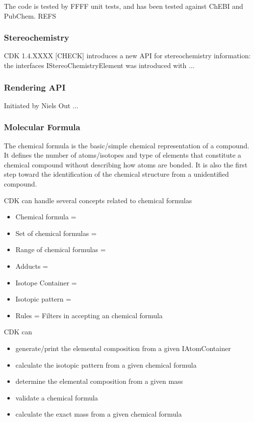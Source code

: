 \documentclass[10pt]{bmc_article}
\newenvironment{bmcformat}{\begin{raggedright}\baselineskip20pt\sloppy\setboolean{publ}{false}}{\end{raggedright}\baselineskip20pt\sloppy}
\begin{document}
\begin{bmcformat}
  The code is tested by FFFF unit tests, and has been tested against ChEBI and PubChem. REFS

  \subsubsection*{Stereochemistry}
  
  CDK 1.4.XXXX [CHECK] introduces a new API for stereochemistry information: the interfaces
  IStereoChemistryElement was introduced with ...

  \subsubsection*{Rendering API}
  
  Initiated by Niels Out ...
  
  \subsubsection*{Molecular Formula}

The chemical formula is the basic/simple chemical representation of a compound. It defines the number of atoms/isotopes and type of elements that constitute a chemical compound without describing how atoms are bonded.
It is also the first step toward the identification of the chemical structure from a unidentified compound.

CDK can handle several concepts related to chemical formulas
\begin{itemize}
\item Chemical formula =
\item Set of chemical formulas =
\item Range of chemical formulas =
\item Adducts =
\item Isotope Container =
\item Isotopic pattern = 
\item Rules = Filters in accepting an chemical formula
\end{itemize}

CDK can
\begin{itemize}
\item generate/print the elemental composition from a given IAtomContainer
\item calculate the isotopic pattern from a given chemical formula
\item determine the elemental composition from a given mass
\item validate a chemical formula
\item calculate the exact mass from a given chemical formula
\end{itemize}


\end{bmcformat}
\end{document}
